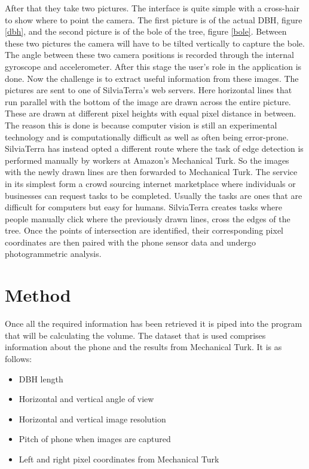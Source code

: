 After that they take two pictures. The interface is quite simple with a cross-hair to show where to point the camera. The first picture is of the actual DBH, figure \ref{dbh}, and the second picture is of the bole of the tree, figure \ref{bole}. Between these two pictures the camera will have to be tilted vertically to capture the bole. The angle between these two camera positions is recorded through the internal gyroscope and accelerometer. After this stage the user's role in the application is done. Now the challenge is to extract useful information from these images. The pictures are sent to one of SilviaTerra's web servers. Here horizontal lines that run parallel with the bottom of the image are drawn across the entire picture. These are drawn at different pixel heights with equal pixel distance in between. The reason this is done is because computer vision is still an experimental technology and is computationally difficult as well as often being error-prone. SilviaTerra has instead opted a different route where the task of edge detection is performed manually by workers at Amazon's Mechanical Turk. So the images with the newly drawn lines are then forwarded to Mechanical Turk. The service in its simplest form a crowd sourcing internet marketplace where individuals or businesses can request tasks to be completed. Usually the tasks are ones that are difficult for computers but easy for humans. SilviaTerra creates tasks where people manually click where the previously drawn lines, cross the edges of the tree. Once the points of intersection are identified, their corresponding pixel coordinates are then paired with the phone sensor data and undergo photogrammetric analysis.

\section{Method}
Once all the required information has been retrieved it is piped into the program that will be calculating the volume. The dataset that is used comprises information about the phone and the results from Mechanical Turk. It is as follows:
\begin{itemize}
	\item DBH length
	\item Horizontal and vertical angle of view
	\item Horizontal and vertical image resolution
	\item Pitch of phone when images are captured
	\item Left and right pixel coordinates from Mechanical Turk
\end{itemize}

